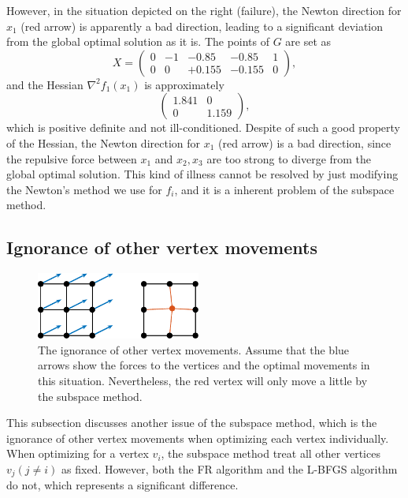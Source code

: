 \documentclass[dvipdfmx,10pt,journal,compsoc]{IEEEtran}
\begin{document}
However, in the situation depicted on the right (failure), the Newton direction for $x_1$ (red arrow) is apparently a bad direction, leading to a significant deviation from the global optimal solution as it is.
The points of $G$ are set as
\begin{equation*}
  X = \begin{pmatrix}
    0 & -1 & -0.85  & -0.85  & 1 \\
    0 & 0  & +0.155 & -0.155 & 0
  \end{pmatrix},
\end{equation*}
and the Hessian $\nabla^2 f_1(x_1)$ is approximately
\begin{equation*}
  \begin{pmatrix}
    1.841 & 0     \\
    0     & 1.159
  \end{pmatrix},
\end{equation*}
which is positive definite and not ill-conditioned.
Despite of such a good property of the Hessian, the Newton direction for $x_1$ (red arrow) is a bad direction, since the repulsive force between $x_1$ and $x_2,x_3$ are too strong to diverge from the global optimal solution.
This kind of illness cannot be resolved by just modifying the Newton's method we use for $f_i$, and it is a inherent problem of the subspace method.

\subsection{Ignorance of other vertex movements}\label{ssec:ignorance}

\begin{figure}[t]
  \centering
  \includegraphics[height=2.2cm]{whyRSNfail2/whyRSNfail2.pdf}
  \caption{
    The ignorance of other vertex movements. Assume that the blue arrows show the forces to the vertices and the optimal movements in this situation. Nevertheless, the red vertex will only move a little by the subspace method.
  }
  \label{fig:whyRSNfail2}
\end{figure}

This subsection discusses another issue of the subspace method, which is the ignorance of other vertex movements when optimizing each vertex individually.
When optimizing for a vertex $v_i$, the subspace method treat all other vertices $v_j (j \neq i)$ as fixed. However, both the FR algorithm and the L-BFGS algorithm do not, which represents a significant difference.
\end{document}
